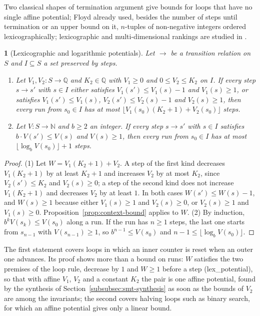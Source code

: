 \documentclass[oneside,english]{amsart}
\numberwithin{equation}{section}
\numberwithin{figure}{section}
\theoremstyle{plain}
\theoremstyle{definition}
\theoremstyle{plain}
\newtheorem{prop}[thm]{\protect\propositionname}
\theoremstyle{remark}
\theoremstyle{plain}
\theoremstyle{definition}
\theoremstyle{plain}
\theoremstyle{remark}
\newcommand{\lean}[1]{{\ttfamily\small #1}}
\providecommand{\propositionname}{Proposition}
\begin{document}
Two classical shapes of termination argument give bounds for loops that have no single affine potential; Floyd \cite{floyd1967assigning} already used, besides the number of steps until termination or an upper bound on it, $n$-tuples of non-negative integers ordered lexicographically; lexicographic and multi-dimensional rankings are studied in \cite{alias2010multi,benamram2014ranking}.

\begin{prop}[Lexicographic and logarithmic potentials]
\label{prop:lex-log}
Let $\to$ be a transition relation on $S$ and $I \subseteq S$ a set preserved by steps.
\begin{enumerate}
    \item Let $V_1, V_2 : S \to \mathbb{Q}$ and $K_2 \in \mathbb{Q}$ with $V_1 \ge 0$ and $0 \le V_2 \le K_2$ on $I$. If every step $s \to s'$ with $s \in I$ either satisfies $V_1(s') \le V_1(s) - 1$ and $V_1(s) \ge 1$, or satisfies $V_1(s') \le V_1(s)$, $V_2(s') \le V_2(s) - 1$ and $V_2(s) \ge 1$, then every run from $s_0 \in I$ has at most $\lfloor V_1(s_0) (K_2 + 1) + V_2(s_0) \rfloor$ steps.
    \item Let $V : S \to \mathbb{N}$ and $b \ge 2$ an integer. If every step $s \to s'$ with $s \in I$ satisfies $b \cdot V(s') \le V(s)$ and $V(s) \ge 1$, then every run from $s_0 \in I$ has at most $\lfloor \log_b V(s_0) \rfloor + 1$ steps.
\end{enumerate}
\end{prop}

\begin{proof}
(1) Let $W = V_1 (K_2 + 1) + V_2$. A step of the first kind decreases $V_1 (K_2 + 1)$ by at least $K_2 + 1$ and increases $V_2$ by at most $K_2$, since $V_2(s') \le K_2$ and $V_2(s) \ge 0$; a step of the second kind does not increase $V_1 (K_2 + 1)$ and decreases $V_2$ by at least $1$. In both cases $W(s') \le W(s) - 1$, and $W(s) \ge 1$ because either $V_1(s) \ge 1$ and $V_2(s) \ge 0$, or $V_2(s) \ge 1$ and $V_1(s) \ge 0$. Proposition~\ref{prop:context-bound} applies to $W$. (2) By induction, $b^k V(s_k) \le V(s_0)$ along a run. If the run has $n \ge 1$ steps, the last one starts from $s_{n-1}$ with $V(s_{n-1}) \ge 1$, so $b^{n-1} \le V(s_0)$ and $n - 1 \le \lfloor \log_b V(s_0) \rfloor$.
\end{proof}

The first statement covers loops in which an inner counter is reset when an outer one advances. Its proof shows more than a bound on runs: $W$ satisfies the two premises of the loop rule, decrease by $1$ and $W \ge 1$ before a step (\lean{lex\_\allowbreak potential}), so that with affine $V_1$, $V_2$ and a constant $K_2$ the pair is one affine potential, found by the synthesis of Section~\ref{subsubsec:smt-synthesis} as soon as the bounds of $V_2$ are among the invariants; the second covers halving loops such as binary search, for which an affine potential gives only a linear bound.
\end{document}
